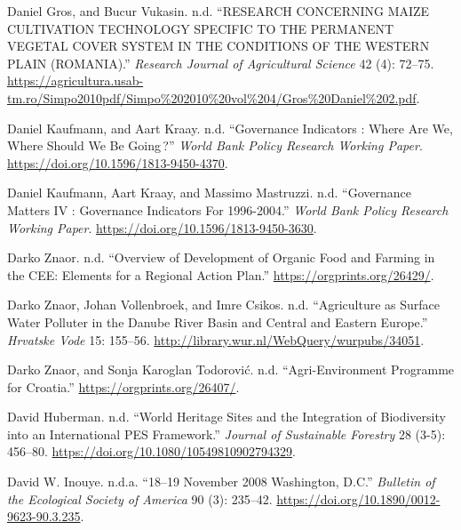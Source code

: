 \begin{CSLReferences}{1}{0}
Daniel Gros, and Bucur Vukasin. n.d. {``RESEARCH CONCERNING MAIZE
CULTIVATION TECHNOLOGY SPECIFIC TO THE PERMANENT VEGETAL COVER SYSTEM IN
THE CONDITIONS OF THE WESTERN PLAIN (ROMANIA).''} \emph{Research Journal
of Agricultural Science} 42 (4): 72--75.
\url{https://agricultura.usab-tm.ro/Simpo2010pdf/Simpo\%202010\%20vol\%204/Gros\%20Daniel\%202.pdf}.

Daniel Kaufmann, and Aart Kraay. n.d. {``Governance Indicators : Where
Are We, Where Should We Be Going\,?''} \emph{World Bank Policy Research
Working Paper}. \url{https://doi.org/10.1596/1813-9450-4370}.

Daniel Kaufmann, Aart Kraay, and Massimo Mastruzzi. n.d. {``Governance
Matters IV : Governance Indicators For 1996-2004.''} \emph{World Bank
Policy Research Working Paper}.
\url{https://doi.org/10.1596/1813-9450-3630}.

Darko Znaor. n.d. {``Overview of Development of Organic Food and Farming
in the CEE: Elements for a Regional Action Plan.''}
\url{https://orgprints.org/26429/}.

Darko Znaor, Johan Vollenbroek, and Imre Csikos. n.d. {``Agriculture as
Surface Water Polluter in the Danube River Basin and Central and Eastern
Europe.''} \emph{Hrvatske Vode} 15: 155--56.
\url{http://library.wur.nl/WebQuery/wurpubs/34051}.

Darko Znaor, and Sonja Karoglan Todorović. n.d. {``Agri-Environment
Programme for Croatia.''} \url{https://orgprints.org/26407/}.

David Huberman. n.d. {``World Heritage Sites and the Integration of
Biodiversity into an International PES Framework.''} \emph{Journal of
Sustainable Forestry} 28 (3-5): 456--80.
\url{https://doi.org/10.1080/10549810902794329}.

David W. Inouye. n.d.a. {``18--19 November 2008 Washington, D.C.''}
\emph{Bulletin of the Ecological Society of America} 90 (3): 235--42.
\url{https://doi.org/10.1890/0012-9623-90.3.235}.


\end{CSLReferences}
